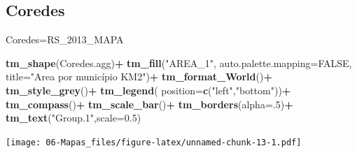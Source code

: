 \documentclass[12pt,brazil,]{book}
\newenvironment{Shaded}{\begin{snugshade}}{\end{snugshade}}
\newcommand{\DataTypeTok}[1]{\textcolor[rgb]{0.13,0.29,0.53}{#1}}
\newcommand{\DecValTok}[1]{\textcolor[rgb]{0.00,0.00,0.81}{#1}}
\newcommand{\FloatTok}[1]{\textcolor[rgb]{0.00,0.00,0.81}{#1}}
\newcommand{\KeywordTok}[1]{\textcolor[rgb]{0.13,0.29,0.53}{\textbf{#1}}}
\newcommand{\NormalTok}[1]{#1}
\newcommand{\OperatorTok}[1]{\textcolor[rgb]{0.81,0.36,0.00}{\textbf{#1}}}
\newcommand{\OtherTok}[1]{\textcolor[rgb]{0.56,0.35,0.01}{#1}}
\newcommand{\StringTok}[1]{\textcolor[rgb]{0.31,0.60,0.02}{#1}}
\begin{document}
\hypertarget{coredes}{%
\subsection{Coredes}\label{coredes}}

\begin{Shaded}
\begin{Highlighting}[]
\NormalTok{Coredes=RS_}\DecValTok{2013}\NormalTok{_MAPA}
\end{Highlighting}
\end{Shaded}

\begin{Shaded}
\end{Shaded}

\begin{Shaded}
\begin{Highlighting}[]
   \KeywordTok{tm_shape}\NormalTok{(Coredes.agg)}\OperatorTok{+}
\StringTok{      }\KeywordTok{tm_fill}\NormalTok{(}\StringTok{"AREA_1"}\NormalTok{, }\DataTypeTok{auto.palette.mapping=}\OtherTok{FALSE}\NormalTok{, }\DataTypeTok{title=}\StringTok{"Area por município KM2"}\NormalTok{)}\OperatorTok{+}
\StringTok{      }\KeywordTok{tm_format_World}\NormalTok{()}\OperatorTok{+}
\StringTok{      }\KeywordTok{tm_style_grey}\NormalTok{()}\OperatorTok{+}
\StringTok{      }\KeywordTok{tm_legend}\NormalTok{(}
        \DataTypeTok{position=}\KeywordTok{c}\NormalTok{(}\StringTok{"left"}\NormalTok{,}\StringTok{"bottom"}\NormalTok{))}\OperatorTok{+}
\StringTok{      }\KeywordTok{tm_compass}\NormalTok{()}\OperatorTok{+}
\StringTok{      }\KeywordTok{tm_scale_bar}\NormalTok{()}\OperatorTok{+}
\StringTok{      }\KeywordTok{tm_borders}\NormalTok{(}\DataTypeTok{alpha=}\NormalTok{.}\DecValTok{5}\NormalTok{)}\OperatorTok{+}
\StringTok{       }\KeywordTok{tm_text}\NormalTok{(}\StringTok{"Group.1"}\NormalTok{,}\DataTypeTok{scale=}\FloatTok{0.5}\NormalTok{)}
\end{Highlighting}
\end{Shaded}

\texttt{[image: 06-Mapas\_files/figure-latex/unnamed-chunk-13-1.pdf]}

\printbibliography[segment=\therefsegment,heading=subbibliography]

\printbibliography
\end{document}
